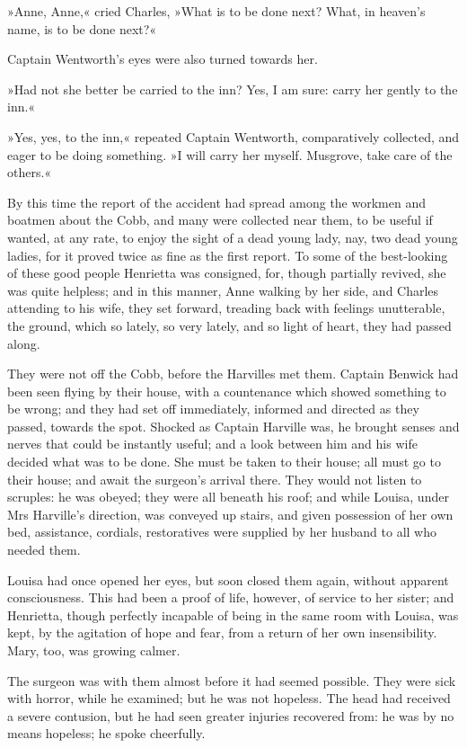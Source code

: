 »Anne, Anne,« cried Charles, »What is to be done next? What, in heaven's name, is to be done next?«

Captain Wentworth's eyes were also turned towards her.

»Had not she better be carried to the inn? Yes, I am sure: carry her gently to the inn.«

»Yes, yes, to the inn,« repeated Captain Wentworth, comparatively collected, and eager to be doing something. »I will carry her myself. Musgrove, take care of the others.«

By this time the report of the accident had spread among the workmen and boatmen about the Cobb, and many were collected near them, to be useful if wanted, at any rate, to enjoy the sight of a dead young lady, nay, two dead young ladies, for it proved twice as fine as the first report. To some of the best-looking of these good people Henrietta was consigned, for, though partially revived, she was quite helpless; and in this manner, Anne walking by her side, and Charles attending to his wife, they set forward, treading back with feelings unutterable, the ground, which so lately, so very lately, and so light of heart, they had passed along.

They were not off the Cobb, before the Harvilles met them. Captain Benwick had been seen flying by their house, with a countenance which showed something to be wrong; and they had set off immediately, informed and directed as they passed, towards the spot. Shocked as Captain Harville was, he brought senses and nerves that could be instantly useful; and a look between him and his wife decided what was to be done. She must be taken to their house; all must go to their house; and await the surgeon's arrival there. They would not listen to scruples: he was obeyed; they were all beneath his roof; and while Louisa, under Mrs Harville's direction, was conveyed up stairs, and given possession of her own bed, assistance, cordials, restoratives were supplied by her husband to all who needed them.

Louisa had once opened her eyes, but soon closed them again, without apparent consciousness. This had been a proof of life, however, of service to her sister; and Henrietta, though perfectly incapable of being in the same room with Louisa, was kept, by the agitation of hope and fear, from a return of her own insensibility. Mary, too, was growing calmer.

The surgeon was with them almost before it had seemed possible. They were sick with horror, while he examined; but he was not hopeless. The head had received a severe contusion, but he had seen greater injuries recovered from: he was by no means hopeless; he spoke cheerfully.

